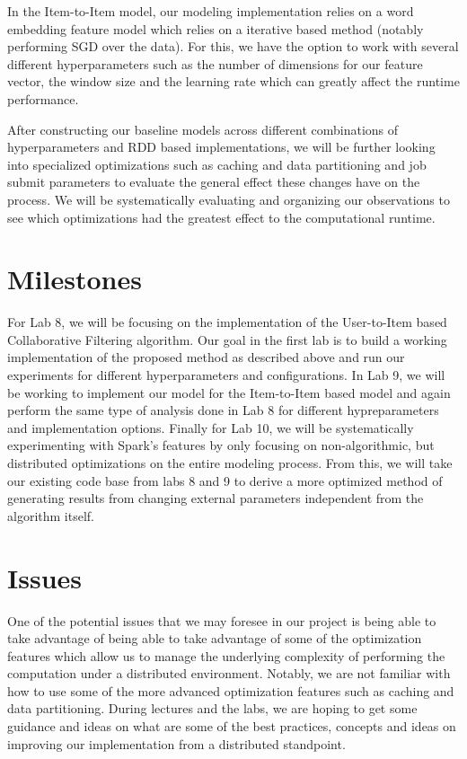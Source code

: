 \documentclass[a4paper, 11pt]{article}
\begin{document}
In the Item-to-Item model, our modeling implementation relies on a word embedding feature model which relies on a iterative based method (notably performing SGD over the data). For this, we have the option to work with several different hyperparameters such as the number of dimensions for our feature vector, the window size and the learning rate which can greatly affect the runtime performance.

After constructing our baseline models across different combinations of hyperparameters and RDD based implementations, we will be further looking into specialized optimizations such as caching and data partitioning and job submit parameters to evaluate the general effect these changes have on the process. We will be systematically evaluating and organizing our observations to see which optimizations had the greatest effect to the computational runtime.

\section*{Milestones}
For Lab 8, we will be focusing on the implementation of the User-to-Item based Collaborative Filtering algorithm. Our goal in the first lab is to build a working implementation of the proposed method as described above and run our experiments for different hyperparameters and configurations. In Lab 9, we will be working to implement our model for the Item-to-Item based model and again perform the same type of analysis done in Lab 8 for different hypreparameters and implementation options. Finally for Lab 10, we will be systematically experimenting with Spark's features by only focusing on non-algorithmic, but distributed optimizations on the entire modeling process. From this, we will take our existing code base from labs 8 and 9 to derive a more optimized method of generating results from changing external parameters independent from the algorithm itself.

\section*{Issues}
One of the potential issues that we may foresee in our project is being able to take advantage of being able to take advantage of some of the optimization features which allow us to manage the underlying complexity of performing the computation under a distributed environment. Notably, we are not familiar with how to use some of the more advanced optimization features such as caching and data partitioning. During lectures and the labs, we are hoping to get some guidance and ideas on what are some of the best practices, concepts and ideas on improving our implementation from a distributed standpoint.
\end{document}
